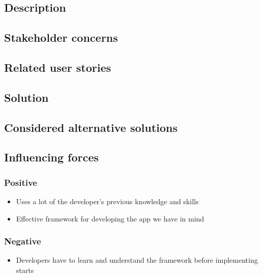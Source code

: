 \documentclass[12pt, a4paper]{article}
\begin{document}
\subsection{Description}

\subsection{Stakeholder concerns}

\subsection{Related user stories}

\subsection{Solution}

\subsection{Considered alternative solutions}

\subsection{Influencing forces}
\begin{minipage}{0.5\textwidth}
    \subsubsection*{Positive}
    \begin{itemize}
        \item Uses a lot of the developer's previous knowledge and skills
        \item Effective framework for developing the app we have in mind
    \end{itemize}
\end{minipage}%
\begin{minipage}{0.5\textwidth}
    \subsubsection*{Negative}
    \begin{itemize}
        \item Developers have to learn and understand the framework before implementing starts
    \end{itemize}
\end{minipage}
\end{document}
